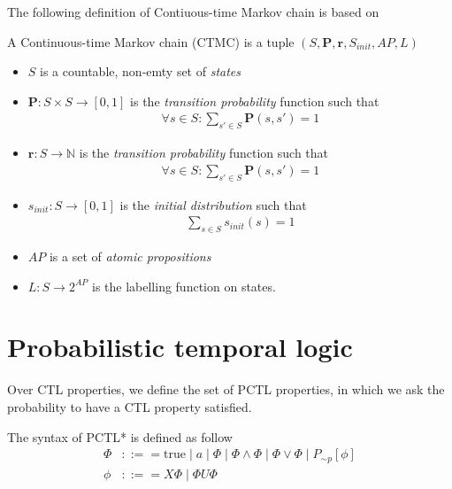 The following definition of Contiuous-time Markov chain is based on \cite{baier2003model}
\begin{definition}
    A Continuous-time Markov chain (CTMC) is a tuple $(S,\mathbf{P}, \mathbf{r}, S_{init}, AP, L)$
    \cite{baier2003model}
    \begin{itemize}
        \item $S$ is a countable, non-emty set of \textit{states}
        \item $\mathbf{P}:S\times S \rightarrow [0,1]$ is the \textit{transition probability}
              function such that
              \begin{align*}
                  \forall s \in S : \sum_{s'\in S}\mathbf{P}(s, s') = 1
              \end{align*}
        \item $\mathbf{r}:S \rightarrow \mathbb{N}$ is the \textit{transition probability} function
              such that
              \begin{align*}
                  \forall s \in S : \sum_{s'\in S}\mathbf{P}(s, s') = 1
              \end{align*}
        \item $s_{init}: S \rightarrow [0,1]$ is the \textit{initial distribution} such that
              \begin{align*}
                  \sum_{s\in S}s_{init}(s) = 1
              \end{align*}
        \item $AP$ is a set of \textit{atomic propositions}
        \item $L: S \rightarrow 2^{AP}$ is the labelling function on states.
    \end{itemize}
\end{definition}




\section{Probabilistic temporal logic}

Over CTL properties, we define the set of PCTL properties, in which we ask the probability to have a
CTL property satisfied.

\begin{definition} The syntax of PCTL* is defined as follow
    \begin{align*}
        \Phi & ::== \text{true} \;|\; a \;|\; \Phi \;|\; \Phi \wedge \Phi \;|\; \Phi \vee \Phi \;|\;  P_{\sim  p}[\phi] \\
        \phi & ::== X\Phi \;|\; \Phi U \Phi
    \end{align*}
\end{definition}

